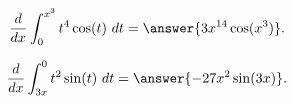 \documentclass{ximera}
\begin{document}
\begin{problem}
\[\frac{d}{dx} \int_0^{x^3} t^4\cos(t) \ dt = \answer{3x^{14}\cos(x^3)}.\]
\end{problem}

\begin{problem}
\[\frac{d}{dx} \int_{3x}^0 t^2\sin(t) \ dt = \answer{-27x^2\sin(3x)}.\]
\end{problem}


\begin{center}
\begin{foldable}
\end{foldable}
\end{center}
\end{document}
